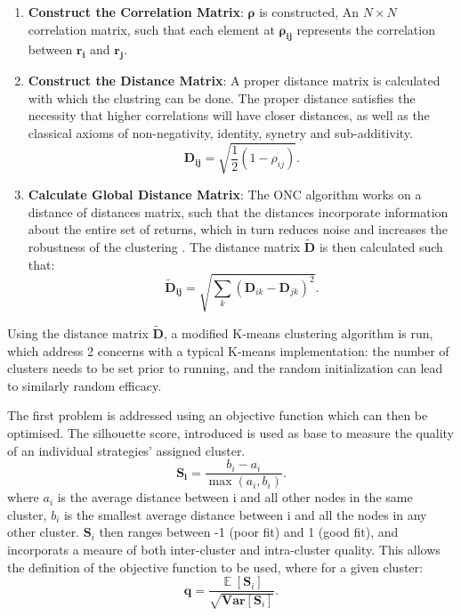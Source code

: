 \documentclass[a4paper,11pt,oneside]{article}
\newcommand{\Var}{\mathbf{Var}}
\DeclareMathOperator*{\E}{\mathbb{E}}
\theoremstyle{plain}
\theoremstyle{definition}
\begin{document}
	\begin{enumerate}
		\item \textbf{Construct the Correlation Matrix}: $\mathbf{\rho}$ is constructed, An $N\times N$ correlation matrix, such that each element at $\mathbf{\rho_{ij}}$ represents the correlation between $\mathbf{r_i}$ and $\mathbf{r_j}$.
		\newline
		\item \textbf{Construct the Distance Matrix}: A proper distance matrix is calculated with which the clustring can be done. The proper distance satisfies the necessity that higher correlations will have closer distances, as well as the classical axioms of non-negativity, identity, synetry and sub-additivity.
		\begin{equation}
			\mathbf{D_{ij}} = \sqrt{\frac{1}{2}\left(1 - \rho_{ij}\right)} .
		\end{equation} 
		\item \textbf{Calculate Global Distance Matrix}: The ONC algorithm works on a distance of distances matrix, such that the distances incorporate information about the entire set of returns, which in turn reduces noise and increases the robustness of the clustering \citep{LopezPrado2016a}. The distance matrix $\mathbf{\tilde{D}}$ is then calculated such that:
				\begin{equation}
				\mathbf{\tilde{D}_{ij}} = \sqrt{\sum_{k}\left(\mathbf{D}_{ik} - \mathbf{D}_{jk}\right)^2} .
				\end{equation} 
	\end{enumerate}
	
	Using the distance matrix $\mathbf{\tilde{D}}$, a modified K-means clustering algorithm is run, which address 2 concerns with a typical K-means implementation: the number of clusters needs to be set prior to running, and the random initialization can lead to similarly random efficacy. \newline
	
	The first problem is addressed using an objective function which can then be optimised. The silhouette score, introduced \citet{Rousseeouw1987} is used as base to measure the quality of an individual strategies' assigned cluster.
	\begin{equation}\label{eq_silhouette}
	\mathbf{S_i} = \frac{b_i - a_i}{\mathrm{\max}\left(a_i, b_i\right)} .
	\end{equation}
	where $a_i$ is the average distance between i and all other nodes in the same cluster, $b_i$ is the smallest average distance between i and all the nodes in any other cluster. $\mathbf{S}_i$ then ranges between -1 (poor fit) and 1 (good fit), and incorporats a meaure of both inter-cluster and intra-cluster quality. This allows the definition of the objective function to be used, where for a given cluster:
	\begin{equation}\label{eq_cluster_q}
	\mathbf{q} = \frac{\E[{\mathbf{S}_i}]}{\sqrt{\Var[{\mathbf{S}_i}]}} .
	\end{equation} 
	
\end{document}
